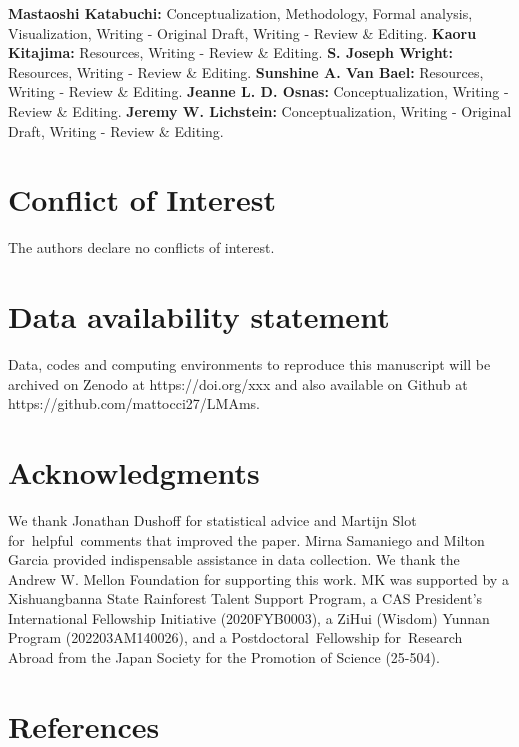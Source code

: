 \documentclass[
  12pt,
  letterpaper,
  DIV=11,
  numbers=noendperiod]{scrartcl}
\begin{document}
\textbf{Mastaoshi Katabuchi:} Conceptualization, Methodology, Formal
analysis, Visualization, Writing - Original Draft, Writing - Review \&
Editing. \textbf{Kaoru Kitajima:} Resources, Writing - Review \&
Editing. \textbf{S. Joseph Wright:} Resources, Writing - Review \&
Editing. \textbf{Sunshine A. Van Bael:} Resources, Writing - Review \&
Editing. \textbf{Jeanne L. D. Osnas:} Conceptualization, Writing -
Review \& Editing. \textbf{Jeremy W. Lichstein:} Conceptualization,
Writing - Original Draft, Writing - Review \& Editing.

\section{Conflict of Interest}\label{conflict-of-interest}

The authors declare no conflicts of interest.

\section{Data availability statement}\label{data-availability-statement}

Data, codes and computing environments to reproduce this manuscript will
be archived on Zenodo at https://doi.org/xxx and also available on
Github at https://github.com/mattocci27/LMAms.

\section{Acknowledgments}\label{acknowledgments}

We thank Jonathan Dushoff for statistical advice and Martijn Slot
for~helpful~comments that improved the paper. Mirna Samaniego and Milton
Garcia provided indispensable assistance in data collection. We thank
the Andrew W. Mellon Foundation for supporting this work. MK was
supported by a Xishuangbanna State Rainforest Talent Support Program, a
CAS President's International Fellowship Initiative (2020FYB0003), a
ZiHui (Wisdom) Yunnan Program (202203AM140026), and a
Postdoctoral~Fellowship for~Research Abroad from the Japan Society for
the Promotion of Science (25-504).

\section{References}\label{references}
\end{document}

